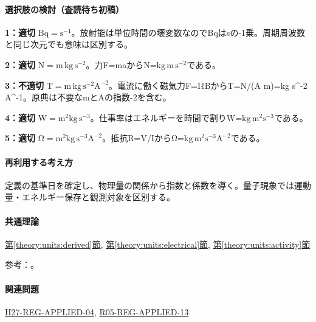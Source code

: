 \paragraph{選択肢の検討（査読待ち初稿）}\mbox{}\par

\noindent\textbf{1：適切} \(\mathrm{Bq=s^{-1}}\)。放射能は単位時間の壊変数なのでBqはsの-1乗。周期周波数と同じ次元でも意味は区別する。\par

\noindent\textbf{2：適切} \(\mathrm{N=m\,kg\,s^{-2}}\)。力F=\allowbreak{}maからN=\(\mathrm{kg\,m\,s^{-2}}\)である。\par

\noindent\textbf{3：不適切} \(\mathrm{T=m\,kg\,s^{-2}A^{-2}}\)。電流に働く磁気力F=\allowbreak{}IℓBからT=\allowbreak{}N/(A m)=\allowbreak{}kg s\textasciicircum{}-2 A\textasciicircum{}-1。原典は不要なmとAの指数-2を含む。\par

\noindent\textbf{4：適切} \(\mathrm{W=m^2kg\,s^{-3}}\)。仕事率はエネルギーを時間で割りW=\(\mathrm{kg\,m^2s^{-3}}\)である。\par

\noindent\textbf{5：適切} \(\mathrm{\Omega=m^2kg\,s^{-3}A^{-2}}\)。抵抗R=\allowbreak{}V/IからΩ=\(\mathrm{kg\,m^2s^{-3}A^{-2}}\)である。\par

\paragraph{再利用する考え方} 定義の基準日を確定し、物理量の関係から指数と係数を導く。量子現象では運動量・エネルギー保存と観測対象を区別する。

\paragraph{共通理論} \hyperref[theory:units:derived]{第\ref*{theory:units:derived}節}, \hyperref[theory:units:electrical]{第\ref*{theory:units:electrical}節}, \hyperref[theory:units:activity]{第\ref*{theory:units:activity}節}

\par 参考：\cite{si_nist811,si_brochure9}。

\paragraph{関連問題} \hyperref[q:h27-reg-applied-04]{H27-REG-APPLIED-04}, \hyperref[q:r05-reg-applied-13]{R05-REG-APPLIED-13}

